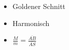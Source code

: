 \begin{multicols}{2}
\begin{minipage}{3cm}
\end{minipage}
\begin{minipage}{5cm}
\begin{itemize}
	\item Goldener Schnitt
	\item Harmonisch
	\item $\frac{M}{m}=\frac{\overline{AB}}{\overline{AS}}$
\end{itemize}
\end{minipage}
\end{multicols}

